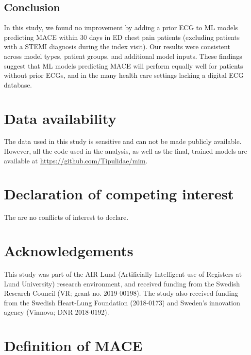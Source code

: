 \documentclass[preprint]{elsarticle}
\begin{document}
\subsection{Conclusion}
In this study, we found no improvement by adding a prior ECG to ML models predicting MACE within 30 days in ED chest pain patients (excluding patients with a STEMI diagnosis during the index visit). Our results were consistent across model types, patient groups, and additional model inputs. These findings suggest that ML models predicting MACE will perform equally well for patients without prior ECGs, and in the many health care settings lacking a digital ECG database.

\section*{Data availability}
The data used in this study is sensitive and can not be made publicly available. However, all the code used in the analysis, as well as the final, trained models are available at \url{https://github.com/Tipulidae/mim}. 

\section*{Declaration of competing interest}
The are no conflicts of interest to declare.

\section*{Acknowledgements}
This study was part of the AIR Lund (Artificially Intelligent use of Registers at Lund University) research environment, and received funding from the Swedish Research Council (VR; grant no. 2019-00198). The study also received funding from the Swedish Heart-Lung Foundation (2018-0173) and Sweden's innovation agency (Vinnova; DNR 2018-0192). 



\appendix
\section{Definition of MACE}
\label{sec:appendix:mace}
\end{document}
